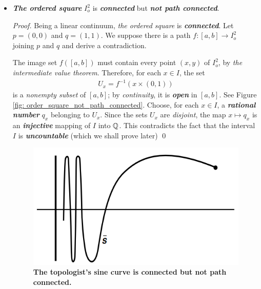\documentclass[11pt]{article}
\begin{document}
\begin{itemize}
\item \begin{example}
\emph{\textbf{The ordered square}} $I_o^2$ is \emph{\textbf{connected}} but \emph{\textbf{not path connected}}.
\end{example}
\begin{proof}
Being a linear continuum, \emph{the ordered square} is \emph{\textbf{connected}}. Let $p = (0, 0)$ and $q =
(1,1)$. We suppose there is a path $f : [a, b] \rightarrow I_o^2$ joining $p$ and $q$ and derive a contradiction.

The image set $f([a, b])$ must contain every point $(x, y)$ of $I_o^2$, by \emph{the intermediate value theorem}. Therefore, for each $x \in I$, the set
\begin{align*}
U_x = f^{-1}(x \times (0, 1))
\end{align*}
is a \emph{nonempty subset} of $[a, b]$; by \emph{continuity}, it is \emph{\textbf{open}} in $[a, b]$. See Figure \ref{fig: order_square_not_path_connected}. Choose, for each $x \in I$, a \emph{\textbf{rational number}} $q_x$ belonging to $U_x$. Since the sets $U_x$ are \emph{disjoint}, the map $x \mapsto q_x$ is an \emph{\textbf{injective}} mapping of $I$ into ${\mathbb Q}$. This contradicts the fact that the interval $I$ is \emph{\textbf{uncountable}} (which we shall prove later) \qed
\end{proof}

\begin{figure}
\begin{minipage}[t]{1\linewidth}
  \centering
  \centerline{\includegraphics[scale = 0.5]{topologist_sine_curve.png}}
\end{minipage}
\caption{\footnotesize{\textbf{The topologist's sine curve is connected but not path connected. \citep{munkres2000topology}}}}
\label{fig: topologist_sine_curve}
\end{figure}



\end{itemize}
\end{document}
